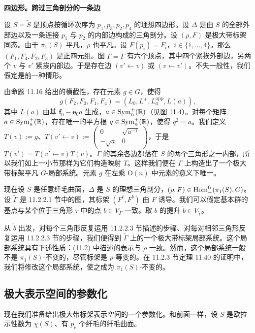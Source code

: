 \textbf{四边形。跨过三角剖分的一条边}

设 $S=\tilde S$ 是顶点按循环次序为 $p_1,p_3,p_2,p_4$ 的理想四边形。设 $\Delta$ 是由 $S$ 的全部外部边以及一条连接 $p_1$ 与 $p_2$ 的内部边构成的三角剖分。设 $(\rho,F)$ 是极大带标架同态。由于 $\pi_1(S)$ 平凡，$\rho$ 也平凡。设 $F(p_i)=F_i$，$i\in\{1,\dots,4\}$。那么 $(F_1,F_4,F_2,F_3)$ 是正四元组。图 $\Gamma=\tilde\Gamma$ 有六个顶点，其中四个紧挨外部边，另两个 $v$ 与 $v'$ 紧挨内部边。于是存在边 $(v'\leftarrow v)$ 或 $(v\leftarrow v')$。不失一般性，我们假定是前一种情形。



由命题 11.16 给出的横截性，存在元素 $g\in G$，使得
\[
g(F_2,F_3,F_1,F_4)=(L_0,L^{+},L_0^{\mathrm{opp}},L(a)),
\]
其中 $L(a)$ 由基 $\mathbf{f}_0-\mathbf{e}_0 a$ 生成，$a\in\operatorname{Sym}_n^{+}(\mathbb{R})$（见图 11.4）。对每个矩阵 $a\in\operatorname{Sym}_n^{+}(\mathbb{R})$，存在唯一的平方根 $q\in\operatorname{Sym}_n^{+}(\mathbb{R})$，使得 $q^{2}=a$。我们定义 $T(v):=g$、$T(v'\leftarrow v):=\begin{pmatrix} 0 & \sqrt{a^{-1}}\\ -\sqrt{a} & 0\end{pmatrix}$，于是 $T(v')=T(v'\leftarrow v)T(v)$。$\Gamma$ 的其余各边都落在 $S$ 的两个三角形之一内部，所以我们如上一小节那样为它们构造映射 $T$。这样我们便在 $\Gamma$ 上构造出了一个极大带标架平凡 $G$-局部系统。元素 $g$ 在左乘 $\mathrm{O}(n)$ 中元素的意义下唯一。

现在设 $S$ 是任意纤毛曲面，$\Delta$ 是 $S$ 的理想三角剖分，$(\rho,F)\in\operatorname{Hom}^{\mathrm{fr}}_{+}(\pi_1(S),G)$。设 $\tilde\Gamma$ 是 11.2.2.1 节中的图，其标架 $(F^{t},F^{b})$ 由 $F$ 诱导。我们可以假定基本群的基点与某个位于三角形 $\tau$ 中的点 $b\in V_\Gamma$ 一致。取 $b$ 的提升 $\tilde b\in V_{\tilde\Gamma}$。

从 $\tilde b$ 出发，对每个三角形反复运用 11.2.2.3 节描述的步骤、对每对相邻三角形反复运用 11.2.2.3 节的步骤，我们便得到 $\tilde\Gamma$ 上的一个极大带标架局部系统。这个局部系统具有下述性质：(11.2) 中描述的表示与 $\rho$ 一致。然而，这个局部系统一般不是 $\pi_1(S)$-不变的，尽管标架是 $\rho$-等变的。在 11.2.3 节定理 11.40 的证明中，我们将修改这个局部系统，使之成为 $\pi_1(S)$-不变的。

\subsection{极大表示空间的参数化}

现在我们准备给出极大带标架表示空间的一个参数化。和前面一样，设 $S$ 是欧拉示性数为 $\chi(S)$、有 $p_e$ 个纤毛的纤毛曲面。

